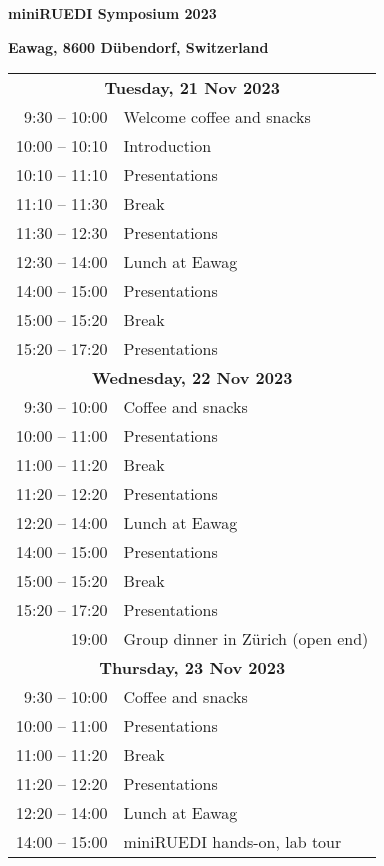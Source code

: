 \documentclass[12pt]{extbook}
\begin{document}
\thispagestyle{empty}
\begin{center}

{\LARGE \bf miniRUEDI Symposium 2023}

\bigskip
\bigskip
\bigskip

{\large \bf Eawag, 8600 Dübendorf, Switzerland}

\bigskip
\bigskip
\bigskip
\bigskip
\bigskip
\bigskip



\begin{tabular}{r@{\hskip 0.5in}l}

\multicolumn{2}{c}{\bf Tuesday, 21 Nov 2023}\\[2ex]
9:30  -- 10:00	&	Welcome coffee and snacks\\
10:00 -- 10:10	&	Introduction\\
10:10 -- 11:10	&	Presentations\\   %
11:10 -- 11:30	&	Break\\
11:30 -- 12:30	& Presentations\\   %
12:30 -- 14:00	&	Lunch at Eawag\\
14:00 -- 15:00	&	Presentations\\   %
15:00 -- 15:20	&	Break\\
15:20 -- 17:20	&	Presentations\\[8ex]   %

\multicolumn{2}{c}{\bf Wednesday, 22 Nov 2023}\\[2ex]
9:30  -- 10:00	&	Coffee and snacks\\
10:00 -- 11:00	&	Presentations\\   %
11:00 -- 11:20	&	Break\\
11:20 -- 12:20	& Presentations\\   %
12:20 -- 14:00	&	Lunch at Eawag\\
14:00 -- 15:00	&	Presentations\\   %
15:00 -- 15:20	&	Break\\
15:20 -- 17:20	&	Presentations\\   %
19:00 \phantom{-- 00:00}	&	Group dinner in Zürich (open end)\\[8ex]

\multicolumn{2}{c}{\bf Thursday, 23 Nov 2023}\\[2ex]
9:30  -- 10:00	&	Coffee and snacks\\   %
10:00 -- 11:00	&	Presentations\\
11:00 -- 11:20	&	Break\\
11:20 -- 12:20	& Presentations\\       %
12:20 -- 14:00	&	Lunch at Eawag\\
14:00 -- 15:00	&	miniRUEDI hands-on, lab tour\\[1.5ex]

\end{tabular}

\end{center}
\end{document}
